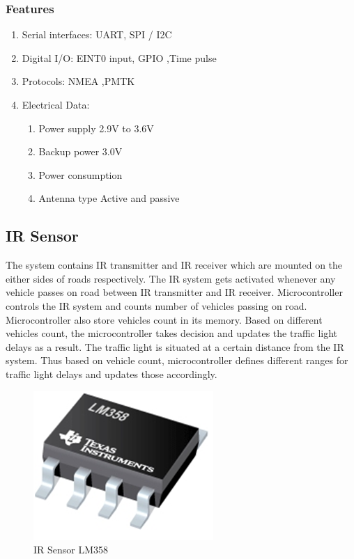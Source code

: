 \documentclass[12pt,a4paper,oneside,openright]{report}
\begin{document}
\subsubsection{Features}
\begin{enumerate}
 \item Serial interfaces: UART, SPI / I2C
\item Digital I/O: EINT0 input, GPIO ,Time pulse
\item Protocols: NMEA ,PMTK
\item Electrical Data:
  \begin{enumerate}
   \item Power supply 2.9V to 3.6V
  \item Backup power 3.0V
\item Power consumption
\item Antenna type Active and passive
  \end{enumerate}
\end{enumerate}


\subsection{IR Sensor}
The system contains IR transmitter and IR receiver which are mounted on the either sides of roads respectively. The IR system gets activated whenever any vehicle passes on road between IR transmitter and IR receiver. Microcontroller controls the IR system and counts number of vehicles passing on road. Microcontroller also store vehicles count in its memory. Based on different vehicles count, the microcontroller takes decision and updates the traffic light delays as a result. The traffic light is situated at a certain distance from the IR system. Thus based on vehicle count, microcontroller defines different ranges for traffic light delays and updates those accordingly.

\begin{figure}[!h]
 \centering
 \includegraphics[width = .40\textwidth]{Figures/13.jpg}
 \caption{IR Sensor LM358}
 \label{ir}
\end{figure}
\end{document}
